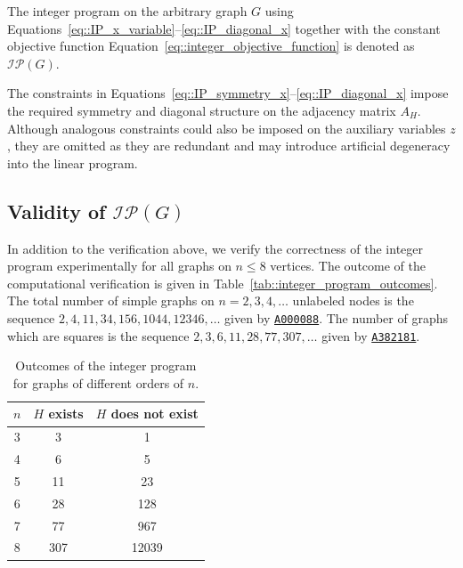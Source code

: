 \documentclass[11pt]{report}
\begin{document}


The integer program on the arbitrary graph $G$ using Equations~\eqref{eq::IP_x_variable}--\eqref{eq::IP_diagonal_x} together with the constant objective function Equation~\eqref{eq::integer_objective_function} is denoted as $\mathcal{IP}(G)$. 

The constraints in Equations~\eqref{eq::IP_symmetry_x}--\eqref{eq::IP_diagonal_x} impose the required symmetry and diagonal structure on the adjacency matrix $A_H$. Although analogous constraints could also be imposed on the auxiliary variables $z$, they are omitted as they are redundant and may introduce artificial degeneracy into the linear program.

\subsection{Validity of $\mathcal{IP}(G)$} \label{subsec::integer_program_validity}



In addition to the verification above, we verify the correctness of the integer program experimentally for all graphs on $n \leq 8$ vertices. The outcome of the computational verification is given in
Table~\eqref{tab::integer_program_outcomes}. The total number of simple graphs on $n=2,3,4,\dots$ unlabeled nodes is the sequence $2,4,11,34,156,1044,12346,\dots$ given by \href{https://oeis.org/A000088}{\texttt{A000088}}. The number of graphs which are squares is the sequence
$2,3,6,11,28,77,307,\dots$ given by \href{https://oeis.org/A382181}{\texttt{A382181}}.

\begin{table}[!htbp]
  \centering
  \begin{tabular}{c|cc}
  \hline
  $n$ 
  & $H$ exists
  & $H$ does not exist \\
  \hline
  3 & 3   & 1    \\
  4 & 6   & 5    \\
  5 & 11  & 23   \\
  6 & 28  & 128  \\
  7 & 77  & 967  \\
  8 & 307 & 12039 \\
  \hline
  \end{tabular}
  \caption{Outcomes of the integer program for graphs of different orders of $n$.}
  \label{tab::integer_program_outcomes}
\end{table}
\end{document}
